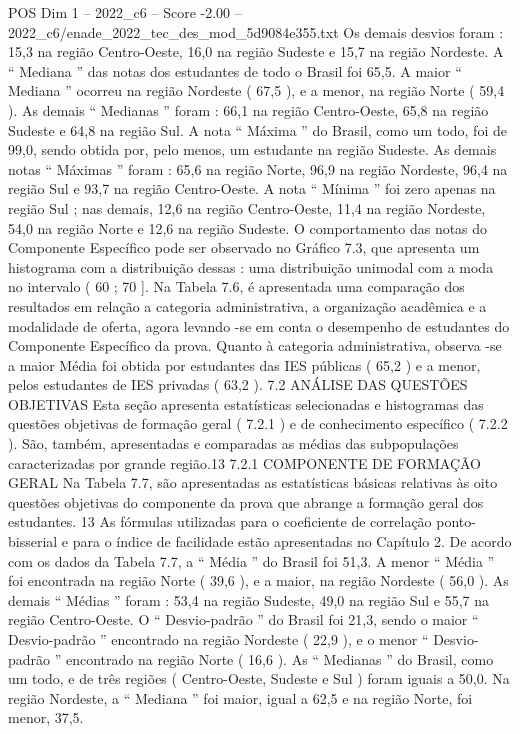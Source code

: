 \begin{textsample}{POS Dim 1 – 2022\_c6 – Score -2.00 – 2022\_c6/enade\_2022\_tec\_des\_mod\_5d9084e355.txt}
Os demais desvios foram : 15,3 na região Centro-Oeste, 16,0 na região Sudeste e 15,7 na região Nordeste.
A “ Mediana ” das notas dos estudantes de todo o Brasil foi 65,5.
A maior “ Mediana ” ocorreu na região Nordeste ( 67,5 ), e a menor, na região Norte ( 59,4 ).
As demais “ Medianas ” foram : 66,1 na região Centro-Oeste, 65,8 na região Sudeste e 64,8 na região Sul.
A nota “ Máxima ” do Brasil, como um todo, foi de 99,0, sendo obtida por, pelo menos, um estudante na região Sudeste.
As demais notas “ Máximas ” foram : 65,6 na região Norte, 96,9 na região Nordeste, 96,4 na região Sul e 93,7 na região Centro-Oeste.
A nota “ Mínima ” foi zero apenas na região Sul ; nas demais, 12,6 na região Centro-Oeste, 11,4 na região Nordeste, 54,0 na região Norte e 12,6 na região Sudeste.
O comportamento das notas do Componente Específico pode ser observado no Gráfico 7.3, que apresenta um histograma com a distribuição dessas : uma distribuição unimodal com a moda no intervalo ( 60 ; 70 ].
Na Tabela 7.6, é apresentada uma comparação dos resultados em relação a categoria administrativa, a organização acadêmica e a modalidade de oferta, agora levando -se em conta o desempenho de estudantes do Componente Específico da prova.
Quanto à categoria administrativa, observa -se a maior Média foi obtida por estudantes das IES públicas ( 65,2 ) e a menor, pelos estudantes de IES privadas ( 63,2 ). 7.2 ANÁLISE DAS QUESTÕES OBJETIVAS Esta seção apresenta estatísticas selecionadas e histogramas das questões objetivas de formação geral ( 7.2.1 ) e de conhecimento específico ( 7.2.2 ).
São, também, apresentadas e comparadas as médias das subpopulações caracterizadas por grande região.13 7.2.1 COMPONENTE DE FORMAÇÃO GERAL Na Tabela 7.7, são apresentadas as estatísticas básicas relativas às oito questões objetivas do componente da prova que abrange a formação geral dos estudantes. 13 As fórmulas utilizadas para o coeficiente de correlação ponto-bisserial e para o índice de facilidade estão apresentadas no Capítulo 2.
De acordo com os dados da Tabela 7.7, a “ Média ” do Brasil foi 51,3.
A menor “ Média ” foi encontrada na região Norte ( 39,6 ), e a maior, na região Nordeste ( 56,0 ).
As demais “ Médias ” foram : 53,4 na região Sudeste, 49,0 na região Sul e 55,7 na região Centro-Oeste.
O “ Desvio-padrão ” do Brasil foi 21,3, sendo o maior “ Desvio-padrão ” encontrado na região Nordeste ( 22,9 ), e o menor “ Desvio-padrão ” encontrado na região Norte ( 16,6 ).
As “ Medianas ” do Brasil, como um todo, e de três regiões ( Centro-Oeste, Sudeste e Sul ) foram iguais a 50,0.
Na região Nordeste, a “ Mediana ” foi maior, igual a 62,5 e na região Norte, foi menor, 37,5.

\end{textsample}
